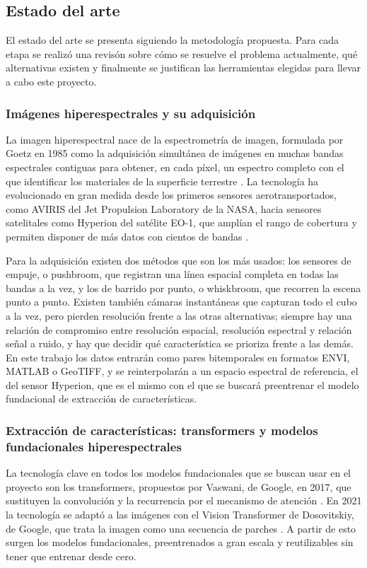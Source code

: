 \documentclass[12pt,onecolumn]{IEEEtran}
\begin{document}
\subsection{Estado del arte}
El estado del arte se presenta siguiendo la metodología propuesta. Para cada etapa se realizó una revisón sobre cómo se resuelve el problema actualmente, qué alternativas existen y finalmente se justifican las herramientas elegidas para llevar a cabo este proyecto.

\subsubsection{Imágenes hiperespectrales y su adquisición}
La imagen hiperespectral nace de la espectrometría de imagen, formulada por Goetz en 1985 como la adquisición simultánea de imágenes en muchas bandas espectrales contiguas para obtener, en cada píxel, un espectro completo con el que identificar los materiales de la superficie terrestre \cite{goetz1985imaging}. La tecnología ha evolucionado en gran medida desde los primeros sensores aerotransportados, como AVIRIS del Jet Propulsion Laboratory de la NASA, hacia sensores satelitales como Hyperion del satélite EO-1, que amplían el rango de cobertura y permiten disponer de más datos con cientos de bandas \cite{bhargava2024hyperspectral}.

Para la adquisición existen dos métodos que son los más usados: los sensores de empuje, o pushbroom, que registran una línea espacial completa en todas las bandas a la vez, y los de barrido por punto, o whiskbroom, que recorren la escena punto a punto. Existen también cámaras instantáneas que capturan todo el cubo a la vez, pero pierden resolución frente a las otras alternativas; siempre hay una relación de compromiso entre resolución espacial, resolución espectral y relación señal a ruido, y hay que decidir qué característica se prioriza frente a las demás. En este trabajo los datos entrarán como pares bitemporales en formatos ENVI, MATLAB o GeoTIFF, y se reinterpolarán a un espacio espectral de referencia, el del sensor Hyperion, que es el mismo con el que se buscará preentrenar el modelo fundacional de extracción de características.

\subsubsection{Extracción de características: transformers y modelos fundacionales hiperespectrales}
La tecnología clave en todos los modelos fundacionales que se buscan usar en el proyecto son los transformers, propuestos por Vaswani, de Google, en 2017, que sustituyen la convolución y la recurrencia por el mecanismo de atención \cite{vaswani2017attention}. En 2021 la tecnología se adaptó a las imágenes con el Vision Transformer de Dosovitskiy, de Google, que trata la imagen como una secuencia de parches \cite{dosovitskiy2021vit}. A partir de esto surgen los modelos fundacionales, preentrenados a gran escala y reutilizables sin tener que entrenar desde cero.
\end{document}

